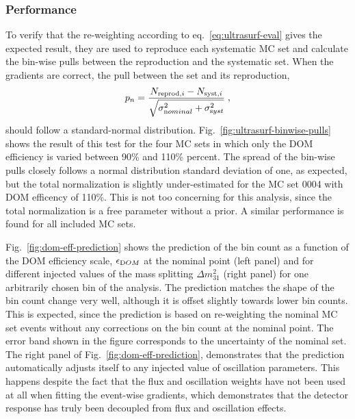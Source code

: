 \subsubsection{Performance}
To verify that the re-weighting according to eq.~\ref{eq:ultrasurf-eval} gives the expected result, they are used to reproduce each systematic MC set and calculate the bin-wise pulls between the reproduction and the systematic set. When the gradients are correct, the pull between the set and its reproduction,
$$p_n = \frac{N_{\mathrm{reprod}, i} - N_{\mathrm{syst}, i}}{\sqrt{\sigma^2_{\rm nominal} + \sigma^2_{\rm syst}}}\;,$$
should follow a standard-normal distribution. Fig.~\ref{fig:ultrasurf-binwise-pulls} shows the result of this test for the four MC sets in which only the DOM efficiency is varied between 90\% and 110\% percent. The spread of the bin-wise pulls closely follows a normal distribution standard deviation of one, as expected, but the total normalization is slightly under-estimated for the MC set 0004 with DOM efficency of 110\%. This is not too concerning for this analysis, since the total normalization is a free parameter without a prior. A similar performance is found for all included MC sets. 

Fig.~\ref{fig:dom-eff-prediction} shows the prediction of the bin count as a function of the DOM efficiency scale, $\epsilon_{\rm DOM}$ at the nominal point (left panel) and for different injected values of the mass splitting $\Delta m^2_{31}$ (right panel) for one arbitrarily chosen bin of the analysis. The prediction matches the shape of the bin count change very well, although it is offset slightly towards lower bin counts. This is expected, since the prediction is based on re-weighting the nominal MC set events without any corrections on the bin count at the nominal point. The error band shown in the figure corresponds to the uncertainty of the nominal set. The right panel of Fig.~\ref{fig:dom-eff-prediction}, demonstrates that the prediction automatically adjusts itself to any injected value of oscillation parameters. This happens despite the fact that the flux and oscillation weights have not been used at all when fitting the event-wise gradients, which demonstrates that the detector response has truly been decoupled from flux and oscillation effects. 

